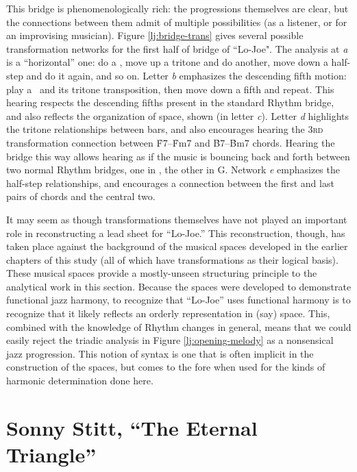 This bridge is phenomenologically rich: the \tf progressions themselves are
clear, but the connections between them admit of multiple possibilities (as a
listener, or for an improvising musician). Figure \ref{lj:bridge-trans} gives
several possible transformation networks for the first half of bridge of
``Lo-Joe". The analysis at \emph{a} is a ``horizontal'' one: do a \tf, move up
a tritone and do another, move down a half-step and do it again, and so on.
Letter \emph{b} emphasizes the descending fifth motion: play a \tf\ and its
tritone transposition, then move down a fifth and repeat. This hearing
respects the descending fifths present in the standard Rhythm bridge, and also
reflects the organization of \tf space, shown (in letter \emph{c}). Letter
\emph{d} highlights the tritone relationships between bars, and also
encourages hearing the \textsc{3rd} transformation connection between
\h{F7}--\h{Fm7} and \h{B7}--\h{Bm7} chords. Hearing the bridge this way allows
hearing as if the music is bouncing back and forth between two normal Rhythm
bridges, one in \Dflat, the other in G. Network \emph{e} emphasizes the
half-step relationships, and encourages a connection between the first and
last pairs of chords and the central two.

It may seem as though transformations themselves have not played an important
role in reconstructing a lead sheet for ``Lo-Joe.'' This reconstruction,
though, has taken place against the background of the musical spaces developed
in the earlier chapters of this study (all of which have transformations as
their logical basis). These musical spaces provide a mostly-unseen structuring
principle to the analytical work in this section. Because the spaces were
developed to demonstrate functional jazz harmony, to recognize that ``Lo-Joe''
uses functional harmony is to recognize that it likely reflects an orderly
representation in (say) \tf space. This, combined with the knowledge of Rhythm
changes in general, means that we could easily reject the triadic analysis in
Figure \ref{lj:opening-melody} as a nonsensical jazz progression. This notion
of syntax is one that is often implicit in the construction of the spaces, but
comes to the fore when used for the kinds of harmonic determination done
here.

\newcommand{\comment}[1]{\clearpage\noindent[``Eternal Triangle'' analysis
  goes here \ldots\ uncomment it later!]}
\section{Sonny Stitt, “The Eternal Triangle”}
\label{sec:eternal-triangle}

